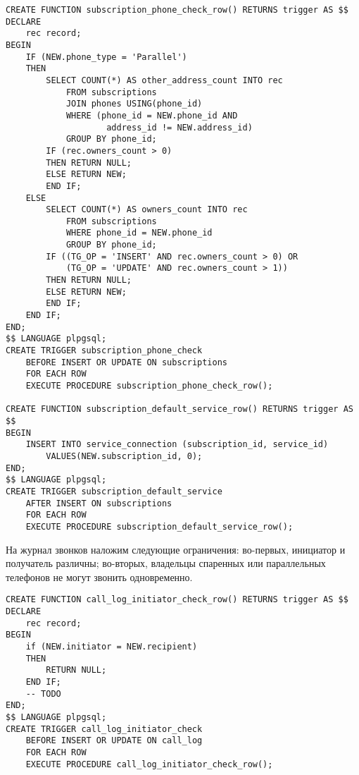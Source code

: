 \documentclass{report}
\begin{document}
\begin{lstlisting}
CREATE FUNCTION subscription_phone_check_row() RETURNS trigger AS $$
DECLARE
    rec record;
BEGIN
    IF (NEW.phone_type = 'Parallel')
    THEN
        SELECT COUNT(*) AS other_address_count INTO rec 
            FROM subscriptions 
            JOIN phones USING(phone_id)
            WHERE (phone_id = NEW.phone_id AND 
                    address_id != NEW.address_id)
            GROUP BY phone_id;
        IF (rec.owners_count > 0)
        THEN RETURN NULL;
        ELSE RETURN NEW;
        END IF;
    ELSE
        SELECT COUNT(*) AS owners_count INTO rec 
            FROM subscriptions 
            WHERE phone_id = NEW.phone_id
            GROUP BY phone_id;
        IF ((TG_OP = 'INSERT' AND rec.owners_count > 0) OR 
            (TG_OP = 'UPDATE' AND rec.owners_count > 1))
        THEN RETURN NULL;
        ELSE RETURN NEW;
        END IF;
    END IF;
END;
$$ LANGUAGE plpgsql;
CREATE TRIGGER subscription_phone_check 
    BEFORE INSERT OR UPDATE ON subscriptions
    FOR EACH ROW 
    EXECUTE PROCEDURE subscription_phone_check_row();

CREATE FUNCTION subscription_default_service_row() RETURNS trigger AS $$
BEGIN
    INSERT INTO service_connection (subscription_id, service_id)
        VALUES(NEW.subscription_id, 0);
END;
$$ LANGUAGE plpgsql;
CREATE TRIGGER subscription_default_service
    AFTER INSERT ON subscriptions
    FOR EACH ROW 
    EXECUTE PROCEDURE subscription_default_service_row();
\end{lstlisting}

На журнал звонков наложим следующие ограничения: во-первых,
инициатор и получатель различны; во-вторых, владельцы спаренных или 
параллельных телефонов не могут звонить одновременно.

\begin{lstlisting}
CREATE FUNCTION call_log_initiator_check_row() RETURNS trigger AS $$
DECLARE
    rec record;
BEGIN
    if (NEW.initiator = NEW.recipient)
    THEN 
        RETURN NULL;
    END IF;
    -- TODO
END;
$$ LANGUAGE plpgsql;
CREATE TRIGGER call_log_initiator_check 
    BEFORE INSERT OR UPDATE ON call_log
    FOR EACH ROW 
    EXECUTE PROCEDURE call_log_initiator_check_row();
\end{lstlisting}
\end{document}
